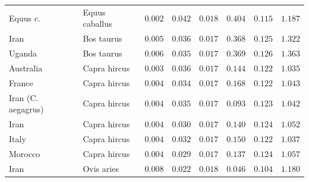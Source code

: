 \documentclass{article}
\begin{document}
\begin{center}
\begin{longtable*}{|l|l|r|r|r|r|r|r|}
            \bottomrule
            \endlastfoot
            Equus c.             & Equus caballus      & $ 0.002$        & $ 0.042$                   & $ 0.018$                      & $ 0.404$                             & $ 0.115$                      & $ 1.187$           \\
            Iran                 & Bos taurus          & $ 0.005$        & $ 0.036$                   & $ 0.017$                      & $ 0.368$                             & $ 0.125$                      & $ 1.322$           \\
            Uganda               & Bos taurus          & $ 0.006$        & $ 0.035$                   & $ 0.017$                      & $ 0.369$                             & $ 0.126$                      & $ 1.363$           \\
            Australia            & Capra hircus        & $ 0.003$        & $ 0.036$                   & $ 0.017$                      & $ 0.144$                             & $ 0.122$                      & $ 1.035$           \\
            France               & Capra hircus        & $ 0.004$        & $ 0.034$                   & $ 0.017$                      & $ 0.168$                             & $ 0.122$                      & $ 1.043$           \\
            Iran (C. aegagrus)   & Capra hircus        & $ 0.004$        & $ 0.035$                   & $ 0.017$                      & $ 0.093$                             & $ 0.123$                      & $ 1.042$           \\
            Iran                 & Capra hircus        & $ 0.004$        & $ 0.030$                   & $ 0.017$                      & $ 0.140$                             & $ 0.124$                      & $ 1.052$           \\
            Italy                & Capra hircus        & $ 0.004$        & $ 0.032$                   & $ 0.017$                      & $ 0.150$                             & $ 0.122$                      & $ 1.037$           \\
            Morocco              & Capra hircus        & $ 0.004$        & $ 0.029$                   & $ 0.017$                      & $ 0.137$                             & $ 0.124$                      & $ 1.057$           \\
            Iran                 & Ovis aries          & $ 0.008$        & $ 0.022$                   & $ 0.018$                      & $ 0.046$                             & $ 0.104$                      & $ 1.180$           \\

\end{longtable*}
\end{center}
\end{document}
